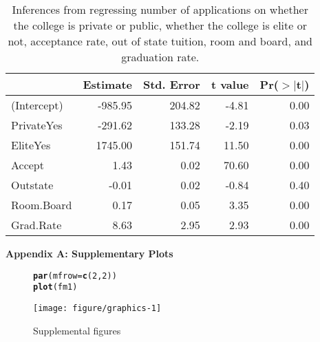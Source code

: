 \documentclass{article}\usepackage[]{graphicx}\usepackage[]{color}
\makeatletter
\def\maxwidth{ %
  \ifdim\Gin@nat@width>\linewidth
    \linewidth
  \else
    \Gin@nat@width
  \fi
}
\newcommand{\hlnum}[1]{\textcolor[rgb]{0.686,0.059,0.569}{#1}}%
\newcommand{\hlstd}[1]{\textcolor[rgb]{0.345,0.345,0.345}{#1}}%
\newcommand{\hlkwc}[1]{\textcolor[rgb]{0.333,0.667,0.333}{#1}}%
\newcommand{\hlkwd}[1]{\textcolor[rgb]{0.737,0.353,0.396}{\textbf{#1}}}%
\newenvironment{kframe}{%
 \def\at@end@of@kframe{}%
 \ifinner\ifhmode%
  \def\at@end@of@kframe{\end{minipage}}%
  \begin{minipage}{\columnwidth}%
 \fi\fi%
 \def\FrameCommand##1{\hskip\@totalleftmargin \hskip-\fboxsep
 \colorbox{shadecolor}{##1}\hskip-\fboxsep
     \hskip-\linewidth \hskip-\@totalleftmargin \hskip\columnwidth}%
 \MakeFramed {\advance\hsize-\width
   \@totalleftmargin\z@ \linewidth\hsize
   \@setminipage}}%
 {\par\unskip\endMakeFramed%
 \at@end@of@kframe}
\newenvironment{knitrout}{}{} %
\makeatother
\begin{document}
\begin{table}[ht]
\centering
\begin{tabular}{|l|rrrr|}
  \hline
 & Estimate & Std. Error & t value & Pr($>$$|$t$|$) \\ 
  \hline
(Intercept) & -985.95 & 204.82 & -4.81 & 0.00 \\ 
  PrivateYes & -291.62 & 133.28 & -2.19 & 0.03 \\ 
  EliteYes & 1745.00 & 151.74 & 11.50 & 0.00 \\ 
  Accept & 1.43 & 0.02 & 70.60 & 0.00 \\ 
  Outstate & -0.01 & 0.02 & -0.84 & 0.40 \\ 
  Room.Board & 0.17 & 0.05 & 3.35 & 0.00 \\ 
  Grad.Rate & 8.63 & 2.95 & 2.93 & 0.00 \\ 
   \hline
\end{tabular}
\caption{Inferences from regressing number of applications on whether the college is private or public, whether the college is elite or not, acceptance rate, out of state tuition, room and board, and graduation rate.} 
\label{reginf}
\end{table}




\newpage
\noindent \Large{{\bf Appendix A: Supplementary Plots}}
\begin{figure}[h!]
\begin{center}
%
%
\begin{knitrout}
\color{fgcolor}\begin{kframe}
\begin{alltt}
  \hlkwd{par}\hlstd{(}\hlkwc{mfrow}\hlstd{=}\hlkwd{c}\hlstd{(}\hlnum{2}\hlstd{,}\hlnum{2}\hlstd{))}
  \hlkwd{plot}\hlstd{(fm1)}
\end{alltt}
\end{kframe}
\texttt{[image: figure/graphics-1]} 

\end{knitrout}
\caption{Supplemental figures}
\label{figures}
\end{center}
\end{figure}
\end{document}
